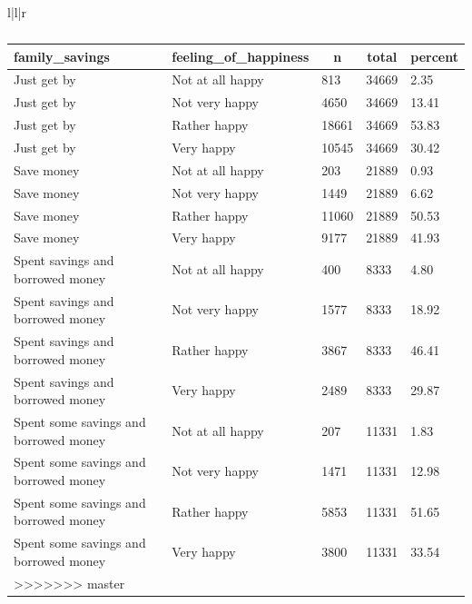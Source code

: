 \documentclass[man, fleqn, noextraspace,floatsintext]{apa6}
\begin{document}
\begin{tabular}{l|l|r}
\begin{table}[tbp]
\begin{center}
\begin{threeparttable}
\caption{\label{tab:happiness by family APA table}}
\begin{tabular}{lllll}
\toprule
family\_savings & \multicolumn{1}{c}{feeling\_of\_happiness} & \multicolumn{1}{c}{n} & \multicolumn{1}{c}{total} & \multicolumn{1}{c}{percent}\\
\midrule
Just get by & Not at all happy & 813 & 34669 & 2.35\\
Just get by & Not very happy & 4650 & 34669 & 13.41\\
Just get by & Rather happy & 18661 & 34669 & 53.83\\
Just get by & Very happy & 10545 & 34669 & 30.42\\
Save money & Not at all happy & 203 & 21889 & 0.93\\
Save money & Not very happy & 1449 & 21889 & 6.62\\
Save money & Rather happy & 11060 & 21889 & 50.53\\
Save money & Very happy & 9177 & 21889 & 41.93\\
Spent savings and borrowed money & Not at all happy & 400 & 8333 & 4.80\\
Spent savings and borrowed money & Not very happy & 1577 & 8333 & 18.92\\
Spent savings and borrowed money & Rather happy & 3867 & 8333 & 46.41\\
Spent savings and borrowed money & Very happy & 2489 & 8333 & 29.87\\
Spent some savings and borrowed money & Not at all happy & 207 & 11331 & 1.83\\
Spent some savings and borrowed money & Not very happy & 1471 & 11331 & 12.98\\
Spent some savings and borrowed money & Rather happy & 5853 & 11331 & 51.65\\
Spent some savings and borrowed money & Very happy & 3800 & 11331 & 33.54\\
\bottomrule
>>>>>>> master
\end{tabular}
\end{threeparttable}
\end{center}
\end{table}


\end{tabular}
\end{document}
